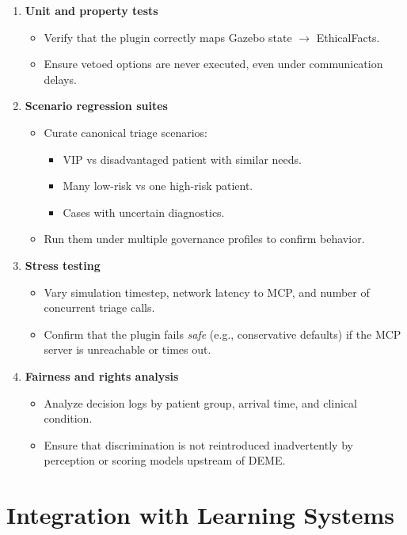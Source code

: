 \documentclass[11pt]{article}
\begin{document}
\begin{enumerate}
  \item \textbf{Unit and property tests}
    \begin{itemize}
      \item Verify that the plugin correctly maps Gazebo state $\to$ EthicalFacts.
      \item Ensure vetoed options are never executed, even under communication delays.
    \end{itemize}

  \item \textbf{Scenario regression suites}
    \begin{itemize}
      \item Curate canonical triage scenarios:
        \begin{itemize}
          \item VIP vs disadvantaged patient with similar needs.
          \item Many low-risk vs one high-risk patient.
          \item Cases with uncertain diagnostics.
        \end{itemize}
      \item Run them under multiple governance profiles to confirm behavior.
    \end{itemize}

  \item \textbf{Stress testing}
    \begin{itemize}
      \item Vary simulation timestep, network latency to MCP, and number of concurrent triage calls.
      \item Confirm that the plugin fails \emph{safe} (e.g., conservative defaults) if the MCP server is unreachable or times out.
    \end{itemize}

  \item \textbf{Fairness and rights analysis}
    \begin{itemize}
      \item Analyze decision logs by patient group, arrival time, and clinical condition.
      \item Ensure that discrimination is not reintroduced inadvertently by perception or scoring models upstream of DEME.
    \end{itemize}
\end{enumerate}

\section{Integration with Learning Systems}
\end{document}
